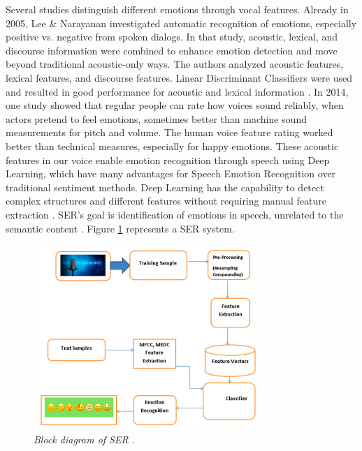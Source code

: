 Several studies distinguish different emotions through vocal features. Already in 2005, Lee \& Narayanan investigated automatic recognition of emotions, especially positive vs. negative from spoken dialogs. In that study, acoustic, lexical, and discourse information were combined to enhance emotion detection and move beyond traditional acoustic-only ways. The authors analyzed acoustic features, lexical features, and discourse features. Linear Discriminant Classifiers were used and resulted in good performance for acoustic and lexical information \autocite{ChulMinLee2005}. In 2014, one study \autocite{Bnziger2014} showed that regular people can rate how voices sound reliably, when actors pretend to feel emotions, sometimes better than machine sound measurements for pitch and volume. The human voice feature rating worked better than technical measures, especially for happy emotions. 
These acoustic features in our voice enable emotion recognition through speech using Deep Learning, which have many advantages for Speech Emotion Recognition over traditional sentiment methods. Deep Learning has the capability to detect complex structures and different features without requiring manual feature extraction \autocite{Khalil2019}. SER’s goal is identification of emotions in speech, unrelated to the semantic content \autocite{Kusal2024}. Figure \ref{fig:blockdiagram-SER} represents a SER system. 

\begin{figure}[ht]
    \centering
    \includegraphics[height=7cm]{png/blockDiagram SER.png}
    \caption{\textit{Block diagram of SER \autocite{Tyagi2024}.}}
    \label{fig:blockdiagram-SER}
\end{figure}

